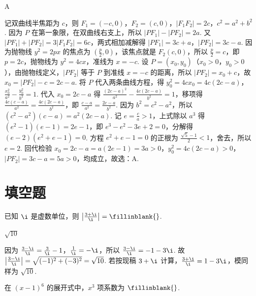 \begin{answer}
A
\end{answer}

\begin{solution}
记双曲线半焦距为 \(c\)，则 \(F_{1}=(-c,0)\)，\(F_{2}=(c,0)\)，\(|F_{1}F_{2}|=2c\)，\(c^{2}=a^{2}+b^{2}\). 因为 \(P\) 在第一象限，在双曲线右支上，所以 \(|PF_{1}|-|PF_{2}|=2a\). 又 \(|PF_{1}|+|PF_{2}|=3|F_{1}F_{2}|=6c\)，两式相加减解得 \(|PF_{1}|=3c+a\)，\(|PF_{2}|=3c-a\). 因为抛物线 \(y^{2}=2px\) 的焦点为 \(\left(\frac{p}{2},0\right)\)，该焦点就是 \(F_{2}(c,0)\)，所以 \(\frac{p}{2}=c\)，即 \(p=2c\)，抛物线为 \(y^{2}=4cx\)，准线为 \(x=-c\). 设 \(P=(x_{0},y_{0})\)（\(x_{0}>0\)，\(y_{0}>0\)），由抛物线定义，\(|PF_{2}|\) 等于 \(P\) 到准线 \(x=-c\) 的距离，所以 \(|PF_{2}|=x_{0}+c\)，故 \(x_{0}=|PF_{2}|-c=2c-a\). 将 \(P\) 代入两条曲线方程，得 \(y_{0}^{2}=4cx_{0}=4c(2c-a)\)，\(\frac{x_{0}^{2}}{a^{2}}-\frac{y_{0}^{2}}{b^{2}}=1\). 代入 \(x_{0}=2c-a\) 得 \(\frac{(2c-a)^{2}}{a^{2}}-\frac{4c(2c-a)}{b^{2}}=1\)，移项得 \(\frac{4c(c-a)}{a^{2}}=\frac{4c(2c-a)}{b^{2}}\)，即 \(\frac{c-a}{a^{2}}=\frac{2c-a}{b^{2}}\). 因为 \(b^{2}=c^{2}-a^{2}\)，所以 \((c^{2}-a^{2})(c-a)=a^{2}(2c-a)\). 记 \(e=\frac{c}{a}>1\)，上式除以 \(a^{3}\) 得 \((e^{2}-1)(e-1)=2e-1\)，即 \(e^{3}-e^{2}-3e+2=0\)，分解得 \((e-2)(e^{2}+e-1)=0\). 方程 \(e^{2}+e-1=0\) 的正根为 \(\frac{\sqrt{5}-1}{2}<1\)，舍去，所以 \(e=2\). 回代检验 \(x_{0}=2c-a=a(2e-1)=3a>0\)，\(y_{0}^{2}=4c(2c-a)>0\)，\(|PF_{2}|=3c-a=5a>0\)，均成立，故选：A.
\end{solution}
\section{填空题}

\begin{problem}
已知 \(\i\) 是虚数单位，则 \(\left|\frac{3+\i}{\i}\right|=\fillinblank{}\).
\end{problem}

\begin{answer}
\(\sqrt{10}\)
\end{answer}

\begin{solution}
因为 \(\frac{3-\i}{\i}=\frac{3}{\i}-1\)，\(\frac{1}{\i}=-\i\)，所以 \(\frac{3-\i}{\i}=-1-3\i\). 故 \(\left|\frac{3-\i}{\i}\right|=\sqrt{(-1)^{2}+(-3)^{2}}=\sqrt{10}\). 若按现稿 \(3+\i\) 计算，\(\frac{3+\i}{\i}=1-3\i\)，模同样为 \(\sqrt{10}\).
\end{solution}

\begin{problem}
在 \((x-1)^6\) 的展开式中，\(x^3\) 项系数为 \(\fillinblank{}\).
\end{problem}

